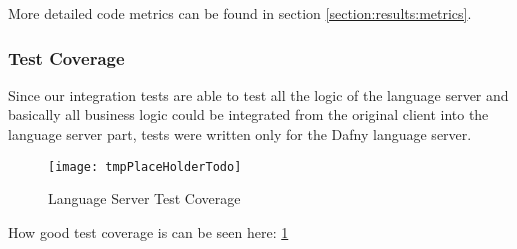 More detailed code metrics can be found in section \ref{section:results:metrics}.

\subsubsection{Test Coverage}
Since our integration tests are able to test all the logic of the language server
and basically all business logic could be integrated from the original client into the language server part,
tests were written only for the Dafny language server.

\begin{figure}[H]
    \centering
    \texttt{[image: tmpPlaceHolderTodo]}
    \caption{Language Server Test Coverage}
    \label{fig:test_coverage}
\end{figure}

How good test coverage is can be seen here: \ref{fig:test_coverage}
